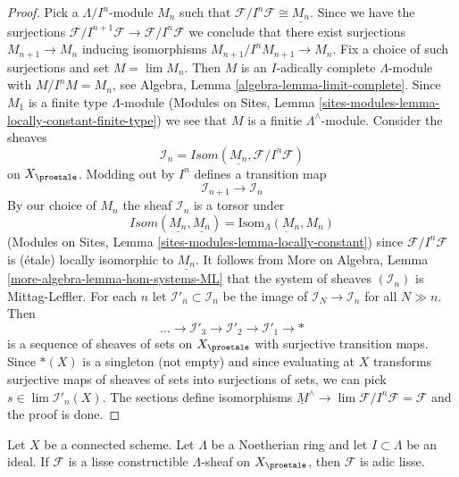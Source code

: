 \begin{proof}
Pick a $\Lambda/I^n$-module $M_n$ such that
$\mathcal{F}/I^n\mathcal{F} \cong \underline{M_n}$.
Since we have the surjections
$\mathcal{F}/I^{n + 1}\mathcal{F} \to \mathcal{F}/I^n\mathcal{F}$
we conclude that there
exist surjections $M_{n + 1} \to M_n$ inducing isomorphisms
$M_{n + 1}/I^nM_{n + 1} \to M_n$. Fix a choice of such surjections
and set $M = \lim M_n$. Then $M$ is an $I$-adically complete
$\Lambda$-module with $M/I^nM = M_n$, see
Algebra, Lemma \ref{algebra-lemma-limit-complete}.
Since $M_1$ is a finite type $\Lambda$-module
(Modules on Sites, Lemma
\ref{sites-modules-lemma-locally-constant-finite-type})
we see that $M$ is a finitie $\Lambda^\wedge$-module.
Consider the sheaves
$$
\mathcal{I}_n = \mathit{Isom}(\underline{M_n}, \mathcal{F}/I^n\mathcal{F})
$$
on $X_\proetale$. Modding out by $I^n$ defines a transition map
$$
\mathcal{I}_{n + 1} \longrightarrow \mathcal{I}_n
$$
By our choice of $M_n$ the sheaf $\mathcal{I}_n$ is a torsor under
$$
\mathit{Isom}(\underline{M_n}, \underline{M_n}) =
\underline{\text{Isom}_\Lambda(M_n, M_n)}
$$
(Modules on Sites, Lemma \ref{sites-modules-lemma-locally-constant})
since $\mathcal{F}/I^n\mathcal{F}$ is (\'etale) locally isomorphic
to $\underline{M_n}$. It follows from
More on Algebra, Lemma \ref{more-algebra-lemma-hom-systems-ML}
that the system of sheaves $(\mathcal{I}_n)$ is Mittag-Leffler.
For each $n$ let $\mathcal{I}'_n \subset \mathcal{I}_n$ be the
image of $\mathcal{I}_N \to \mathcal{I}_n$ for all $N \gg n$.
Then
$$
\ldots \to \mathcal{I}'_3 \to \mathcal{I}'_2 \to \mathcal{I}'_1 \to *
$$
is a sequence of sheaves of sets on $X_\proetale$ with surjective
transition maps. Since $*(X)$ is a singleton (not empty)
and since evaluating at $X$ transforms surjective maps of sheaves of sets
into surjections of sets, we can pick
$s \in \lim \mathcal{I}'_n(X)$. The sections define isomorphisms
$\underline{M}^\wedge \to \lim \mathcal{F}/I^n\mathcal{F} = \mathcal{F}$
and the proof is done.
\end{proof}

\begin{lemma}
\label{lemma-connected-lisse}
Let $X$ be a connected scheme. Let $\Lambda$ be a Noetherian ring and let
$I \subset \Lambda$ be an ideal. If $\mathcal{F}$ is a lisse
constructible $\Lambda$-sheaf on $X_\proetale$, then $\mathcal{F}$
is adic lisse.
\end{lemma}

